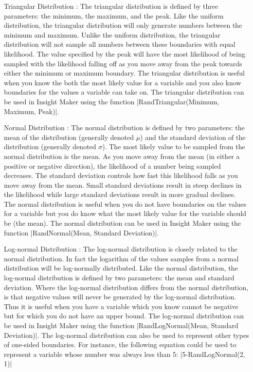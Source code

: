 \documentclass[]{memoir}
\newcommand{\DecValTok}[1]{\textcolor[rgb]{0.25,0.63,0.44}{{#1}}}
\newcommand{\FunctionTok}[1]{\textcolor[rgb]{0.02,0.16,0.49}{{#1}}}
\newcommand{\NormalTok}[1]{{#1}}
\begin{document}
Triangular Distribution : The triangular distribution is defined by
three parameters: the minimum, the maximum, and the peak. Like the
uniform distribution, the triangular distribution will only generate
numbers between the minimum and maximum. Unlike the uniform
distribution, the triangular distribution will not sample all numbers
between these boundaries with equal likelihood. The value specified by
the peak will have the most likelihood of being sampled with the
likelihood falling off as you move away from the peak towards either the
minimum or maximum boundary. The triangular distribution is useful when
you know the both the most likely value for a variable and you also know
boundaries for the values a variable can take on. The triangular
distribution can be used in Insight Maker using the function
|\FunctionTok{RandTriangular}\NormalTok{(Minimum, Maximum, Peak)}|.

Normal Distribution : The normal distribution is defined by two
parameters: the mean of the distribution (generally denoted $\mu$) and
the standard deviation of the distribution (generally denoted $\sigma$).
The most likely value to be sampled from the normal distribution is the
mean. As you move away from the mean (in either a positive or negative
direction), the likelihood of a number being sampled decreases. The
standard deviation controls how fast this likelihood falls as you move
away from the mean. Small standard deviations result in steep declines
in the likelihood while large standard deviations result in more gradual
declines. The normal distribution is useful when you do not have
boundaries on the values for a variable but you do know what the most
likely value for the variable should be (the mean). The normal
distribution can be used in Insight Maker using the function
|\FunctionTok{RandNormal}\NormalTok{(Mean, Standard Deviation)}|.

Log-normal Distribution : The log-normal distribution is closely related
to the normal distribution. In fact the logarithm of the values samples
from a normal distribution will be log-normally distributed. Like the
normal distribution, the log-normal distribution is defined by two
parameters: the mean and standard deviation. Where the log-normal
distribution differs from the normal distribution, is that negative
values will never be generated by the log-normal distribution. Thus it
is useful when you have a variable which you know cannot be negative but
for which you do not have an upper bound. The log-normal distribution
can be used in Insight Maker using the function
|\FunctionTok{RandLogNormal}\NormalTok{(Mean, Standard Deviation)}|. The
log-normal distribution can also be used to represent other types of
one-sided boundaries. For instance, the following equation could be used
to represent a variable whose number was always less than 5:
|\DecValTok{5}\NormalTok{-}\FunctionTok{RandLogNormal}\NormalTok{(}\DecValTok{2}\NormalTok{, }\DecValTok{1}\NormalTok{)}|
\end{document}
